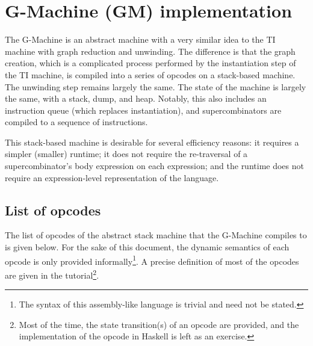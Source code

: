 \section{G-Machine (GM) implementation}
\label{sec:gm}

The G-Machine is an abstract machine with a very similar idea to the TI machine with graph reduction and unwinding. The difference is that the graph creation, which is a complicated process performed by the instantiation step of the TI machine, is compiled into a series of opcodes on a stack-based machine. The unwinding step remains largely the same. The state of the machine is largely the same, with a stack, dump, and heap. Notably, this also includes an instruction queue (which replaces instantiation), and supercombinators are compiled to a sequence of instructions.

This stack-based machine is desirable for several efficiency reasons: it requires a simpler (smaller) runtime; it does not require the re-traversal of a supercombinator's body expression on each expression; and the runtime does not require an expression-level representation of the language.

\subsection{List of opcodes}
\label{sec:gm-opcodes}

The list of opcodes of the abstract stack machine that the G-Machine compiles to is given below. For the sake of this document, the dynamic semantics of each opcode is only provided informally\footnote{The syntax of this assembly-like language is trivial and need not be stated.}. A precise definition of most of the opcodes are given in the tutorial\footnote{Most of the time, the state transition(s) of an opcode are provided, and the implementation of the opcode in Haskell is left as an exercise.}.

